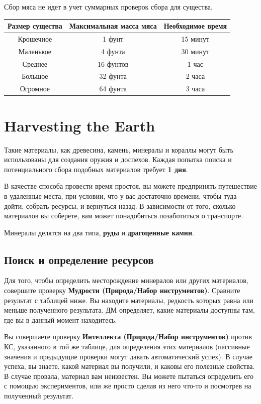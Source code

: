 \documentclass[a4paper, 9pt, twocolumn]{book}
\begin{document}
	Сбор мяса не идет в учет суммарных проверок сбора для существа.
	
	\begin{center}
	\begin{tabular}{|c|c|c|}
		\hline
		\textbf{Размер существа} & \textbf{Максимальная масса мяса} & \textbf{Необходимое время} \\
		\hline
		Крошечное & 1 фунт & 15 минут \\
		\hline
		Маленькое & 4 фунта & 30 минут \\
		\hline
		Среднее & 16 фунтов & 1 час \\
		\hline
		Большое & 32 фунта & 2 часа \\
		\hline
		Огромное & 64 фунта & 3 часа \\
		\hline
	\end{tabular}	
	\end{center}
	
	
	
	\section{Harvesting the Earth}
	
	Такие материалы, как древесина, камень, минералы и кораллы могут быть использованы для создания оружия и доспехов. Каждая попытка поиска и потенциального сбора подобных материалов требует \textbf{1 дня}.
	
	В качестве способа провести время простоя, вы можете предпринять путешествие в удаленные места, при условии, что у вас достаточно времени, чтобы туда дойти, собрать ресурсы, и вернуться назад. В зависимости от того, сколько материалов вы соберете, вам может понадобиться позаботиться о транспорте.
	
	Минералы делятся на два типа, \textbf{руды} и \textbf{драгоценные камни}.
	
	\subsection{Поиск и определение ресурсов}
	
	Для того, чтобы определить месторождение минералов или других материалов, совершите проверку \textbf{Мудрости (Природа/Набор инструментов)}. Сравните результат с таблицей ниже. Вы находите материалы, редкость которых равна или меньше полученного результата. ДМ определяет, какие материалы доступны там, где вы в данный момент находитесь.
	
	Вы совершаете проверку \textbf{Интеллекта (Природа/Набор инструментов)} против КС, указанного в той же таблице, для определения этих материалов (пассивные значения и предыдущие проверки могут давать автоматический успех). В случае успеха, вы знаете, какой материал вы получили, и каковы его полезные свойства. В случае провала, материал вам неизвестен. Вы можете пытаться определить его с помощью экспериментов, или же просто сделав из него что-то и посмотрев на полученный результат.
	
\end{document}
